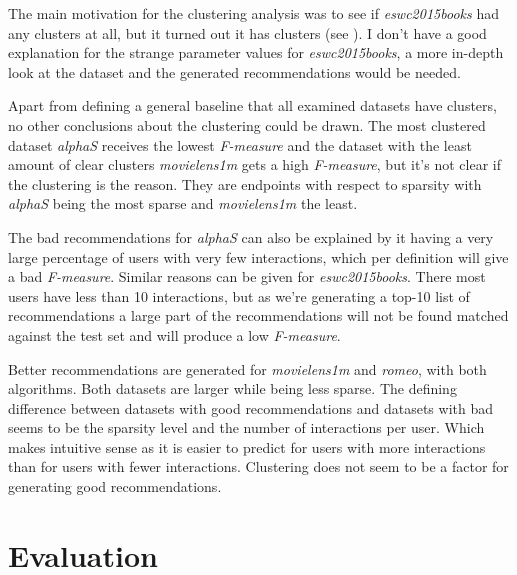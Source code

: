 The main motivation for the clustering analysis was to see if \textit{eswc2015books} had any clusters at all, but it turned out it has clusters (see ).  I don't have a good explanation for the strange parameter values for \textit{eswc2015books}, a more in-depth look at the dataset and the generated recommendations would be needed.

Apart from defining a general baseline that all examined datasets have clusters, no other conclusions about the clustering could be drawn. The most clustered dataset \textit{alphaS} receives the lowest \textit{F-measure} and the dataset with the least amount of clear clusters \textit{movielens1m} gets a high \textit{F-measure}, but it's not clear if the clustering is the reason. They are endpoints with respect to sparsity with \textit{alphaS} being the most sparse and \textit{movielens1m} the least.

The bad recommendations for \textit{alphaS} can also be explained by it having a very large percentage of users with very few interactions, which per definition will give a bad \textit{F-measure}. Similar reasons can be given for \textit{eswc2015books}. There most users have less than 10 interactions, but as we're generating a top-10 list of recommendations a large part of the recommendations will not be found matched against the test set and will produce a low \textit{F-measure}.

Better recommendations are generated for \textit{movielens1m} and \textit{romeo}, with both algorithms. Both datasets are larger while being less sparse. The defining difference between datasets with good recommendations and datasets with bad seems to be the sparsity level and the number of interactions per user. Which makes intuitive sense as it is easier to predict for users with more interactions than for users with fewer interactions. Clustering does not seem to be a factor for generating good recommendations.


\section{Evaluation}

